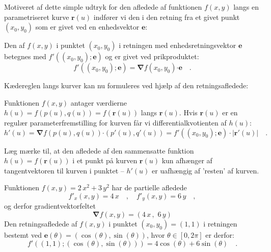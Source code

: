 Motiveret af dette simple udtryk for den afledede af funktionen $f(x,y)$ langs en parametriseret kurve $\mathbf{r}(u)$ indfører vi den  i den retning fra et givet punkt $(x_{0}, y_{0})$ som er givet ved en enhedsvektor $\mathbf{e}$:


\begin{definition}[Retningsafledede]
Den  af $f(x,y)$ i punktet $(x_{0}, y_{0})$  i retningen med enhedsretningsvektor $\mathbf{e}$ betegnes med
$f'((x_{0}, y_{0}); \mathbf{e})$ og er givet ved prikproduktet:
\begin{equation}
f'((x_{0}, y_{0}); \mathbf{e}) = {\bm{\nabla}}f(x_{0}, y_{0}) {\bm{\cdot}} \mathbf{e} \quad .
\end{equation}
\end{definition}

Kædereglen langs kurver kan nu formuleres ved hjælp af den retningsafledede:

\begin{theorem}
Funktionen $f(x,y)$ antager værdierne  $h(u) = f(p(u), q(u)) = f(\mathbf{r}(u))$ langs $\mathbf{r}(u)$. Hvis $\mathbf{r}(u)$ er en regulær parameterfremstilling for kurven får vi differentialkvotienten af $h(u)$:
\begin{equation} \label{eqKurveChain}
h'(u) = {\bm{\nabla}}f(p(u), q(u)) {\bm{\cdot}} (p'(u), q'(u) ) = f'((x_{0}, y_{0}); \mathbf{e})\cdot |\mathbf{r}'(u)| \quad .
\end{equation}
\end{theorem}

\begin{aha}
Læg mærke til, at den afledede af den sammensatte funktion $h(u) = f(\mathbf{r}(u))$ i et punkt på kurven $\mathbf{r}(u)$ kun afhænger af tangentvektoren til kurven i punktet -- $h'(u)$ er uafhængig af 'resten' af kurven.
\end{aha}

\begin{example}[Retningsafledede]\label{exampRetningsafledede}
Funktionen $f(x,y) = 2\,x^{2} + 3\,y^{2}$ har de partielle afledede
\begin{equation}
f'_{x}(x,y) = 4\,x \quad , \quad f'_{y}(x,y) =  6\,y \quad,
\end{equation}
og derfor gradientvektorfeltet
\begin{equation}
{\bm{\nabla}}f(x,y) = (4\,x\, , \,\,6\,y )
\end{equation}
Den retningsafledede af $f(x,y)$ i punktet $(x_{0}, y_{0})= (1,1)$ i retningen bestemt ved $\mathbf{e}(\theta) = (\cos(\theta), \sin(\theta))$, hvor $\theta \in [0, 2\pi]$ er derfor:
\begin{equation}
f'((1,1); (\cos(\theta), \sin(\theta))) = 4\cos(\theta) + 6\sin(\theta) \quad .
\end{equation}
\end{example}


